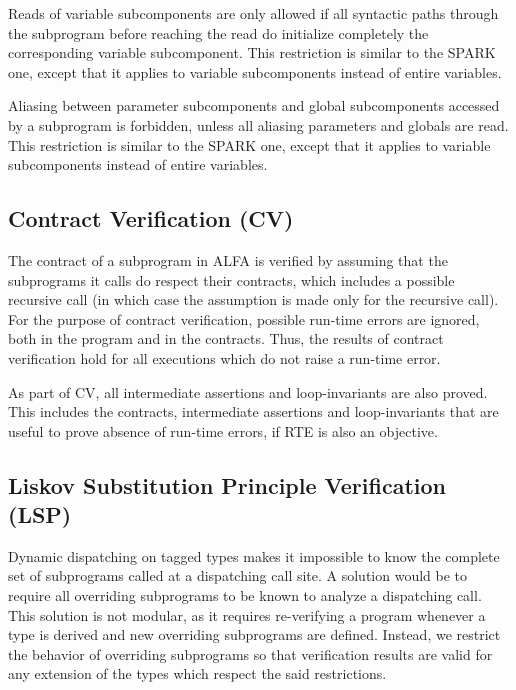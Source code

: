 \documentclass{article}
\begin{document}
Reads of variable subcomponents are only allowed if all syntactic paths through
the subprogram before reaching the read do initialize completely the
corresponding variable subcomponent. This restriction is similar to the SPARK
one, except that it applies to variable subcomponents instead of entire
variables.

Aliasing between parameter subcomponents and global subcomponents accessed by
a subprogram is forbidden, unless all aliasing parameters and globals are
read. This restriction is similar to the SPARK one, except that it applies to
variable subcomponents instead of entire variables.

\subsection{Contract Verification (CV)}

The contract of a subprogram in ALFA is verified by assuming that the
subprograms it calls do respect their contracts, which includes a possible
recursive call (in which case the assumption is made only for the recursive
call). For the purpose of contract verification, possible run-time errors are
ignored, both in the program and in the contracts. Thus, the results of
contract verification hold for all executions which do not raise a run-time
error.

As part of CV, all intermediate assertions and loop-invariants are also
proved. This includes the contracts, intermediate assertions and
loop-invariants that are useful to prove absence of run-time errors, if RTE is
also an objective.

\subsection{Liskov Substitution Principle Verification (LSP)}
\label{sec:LSP}

Dynamic dispatching on tagged types makes it impossible to know the complete
set of subprograms called at a dispatching call site. A solution would be to
require all overriding subprograms to be known to analyze a dispatching
call. This solution is not modular, as it requires re-verifying a program
whenever a type is derived and new overriding subprograms are defined. Instead,
we restrict the behavior of overriding subprograms so that verification results
are valid for any extension of the types which respect the said restrictions.
\end{document}
